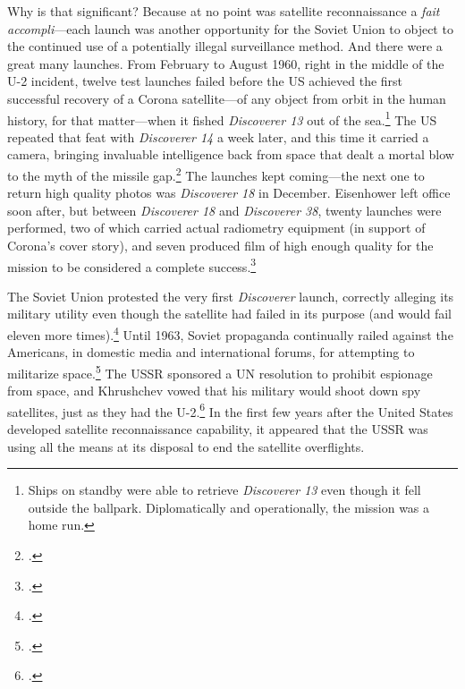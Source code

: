 \documentclass[12pt]{extarticle}
\begin{document}
Why is that significant? Because at no point was satellite reconnaissance a \emph{fait accompli}---each launch was another opportunity for the Soviet Union to object to the continued use of a potentially illegal surveillance method. And there were a great many launches. From February to August 1960, right in the middle of the U-2 incident, twelve test launches failed before the US achieved the first successful recovery of a Corona satellite---of any object from orbit in the human history, for that matter---when it fished \emph{Discoverer 13} out of the sea.\footnote{Ships on standby were able to retrieve \emph{Discoverer 13} even though it fell outside the ballpark. Diplomatically and operationally, the mission was a home run.} The US repeated that feat with \emph{Discoverer 14} a week later, and this time it carried a camera, bringing invaluable intelligence back from space that dealt a mortal blow to the myth of the missile gap.\footcite[101-102. The previous launch failures had been so demoralizing that \emph{Discoverer 13} only carried diagnostic equipment, no cameras.]{lindgren_trust_2000} The launches kept coming---the next one to return high quality photos was \emph{Discoverer 18} in December. Eisenhower left office soon after, but between \emph{Discoverer 18} and \emph{Discoverer 38}, twenty launches were performed, two of which carried actual radiometry equipment (in support of Corona's cover story), and seven produced film of high enough quality for the mission to be considered a complete success.\footcite[103]{lindgren_trust_2000}

The Soviet Union protested the very first \emph{Discoverer} launch, correctly alleging its military utility even though the satellite had failed in its purpose (and would fail eleven more times).\footcite[140]{day_eye_2015} Until 1963, Soviet propaganda continually railed against the Americans, in domestic media and international forums, for attempting to militarize space.\footcite[271]{mcdougall_heavens_1985} The USSR sponsored a UN resolution to prohibit espionage from space, and Khrushchev vowed that his military would shoot down spy satellites, just as they had the U-2.\footcite[166]{day_eye_2015} In the first few years after the United States developed satellite reconnaissance capability, it appeared that the USSR was using all the means at its disposal to end the satellite overflights.
\end{document}

